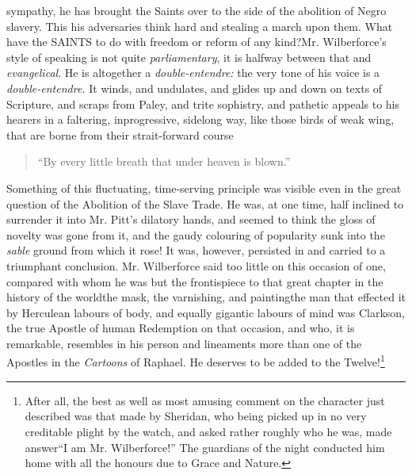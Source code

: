 sympathy, he has brought the Saints over to the side of the
abolition of Negro slavery. This his adversaries think hard and
stealing a march upon them. What have the SAINTS to do with
freedom or reform of any kind?\textemdash Mr. Wilberforce's style
of speaking is not quite \emph{parliamentary}, it is halfway
between that and \emph{evangelical}. He is altogether a
\emph{double-entendre:} the very tone of his voice is a
\emph{double-entendre.} It winds, and undulates, and glides up and
down on texts of Scripture, and scraps from Paley, and trite
sophistry, and pathetic appeals to his hearers in a faltering,
inprogressive, sidelong way, like those birds of weak wing, that
are borne from their strait-forward course
\begin{quote}
  ``By every little breath that under heaven is blown.''

\end{quote}
Something of this fluctuating, time-serving principle was visible
even in the great question of the Abolition of the Slave Trade. He
was, at one time, half inclined to surrender it into Mr. Pitt's
dilatory hands, and seemed to think the gloss of novelty was gone
from it, and the gaudy colouring of popularity sunk into the
\emph{sable} ground from which it rose!  It was, however,
persisted in and carried to a triumphant conclusion.
Mr. Wilberforce said too little on this occasion of one, compared
with whom he was but the frontispiece to that great chapter in the
history of the world\textemdash the mask, the varnishing, and
painting\textemdash the man that effected it by Herculean labours
of body, and equally gigantic labours of mind was Clarkson, the
true Apostle of human Redemption on that occasion, and who, it is
remarkable, resembles in his person and lineaments more than one
of the Apostles in the \emph{Cartoons} of Raphael. He deserves to
be added to the Twelve!\footnote{After all, the best as well as
  most amusing comment on the character just described was that
  made by Sheridan, who being picked up in no very creditable
  plight by the watch, and asked rather roughly who he was, made
  answer\textemdash ``I am Mr. Wilberforce!'' The guardians of the
  night conducted him home with all the honours due to Grace and
  Nature.}
